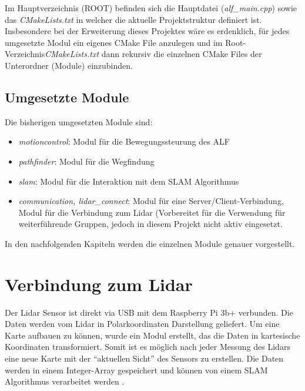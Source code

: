 Im Hauptverzeichnis (ROOT) befinden sich die Hauptdatei (\textit{alf\_main.cpp}) sowie das \textit{CMakeLists.txt} in welcher die aktuelle Projektstruktur definiert ist. Insbesondere bei der Erweiterung dieses Projektes wäre es erdenklich, für jedes umgesetzte Modul ein eigenes CMake File anzulegen und im Root-Verzeichnis\textit{CMakeLists.txt} dann rekursiv die einzelnen CMake Files der Unterordner (Module) einzubinden. 


\subsection*{Umgesetzte Module}

Die bisherigen umgesetzten Module sind: 

\begin{itemize}
\item \textit{motioncontrol}: Modul für die Bewegungssteurung des ALF
\item \textit{pathfinder}: Modul für die Wegfindung 
\item \textit{slam}: Modul für die Interaktion mit dem SLAM Algorithmus

\item \textit{communication, lidar\_connect}: Modul für eine Server/Client-Verbindung, Modul für die Verbindung zum Lidar (Vorbereitet für die Verwendung für weiterführende Gruppen, jedoch in diesem Projekt nicht aktiv eingesetzt.
\end{itemize}

In den nachfolgenden Kapiteln werden die einzelnen Module genauer vorgestellt. 












\section{Verbindung zum Lidar}

Der Lidar Sensor ist direkt via USB mit dem Raspberry Pi 3b+ verbunden. Die Daten werden vom Lidar in Polarkoordinaten Darstellung geliefert. Um eine Karte aufbauen zu können, wurde ein Modul erstellt, das die Daten in kartesische Koordinaten transformiert. Somit ist es möglich nach jeder Messung des Lidars eine neue Karte mit der "`aktuellen Sicht"' des Sensors zu erstellen. Die Daten werden in einem Integer-Array gespeichert und können von einem SLAM Algorithmus verarbeitet werden . 

